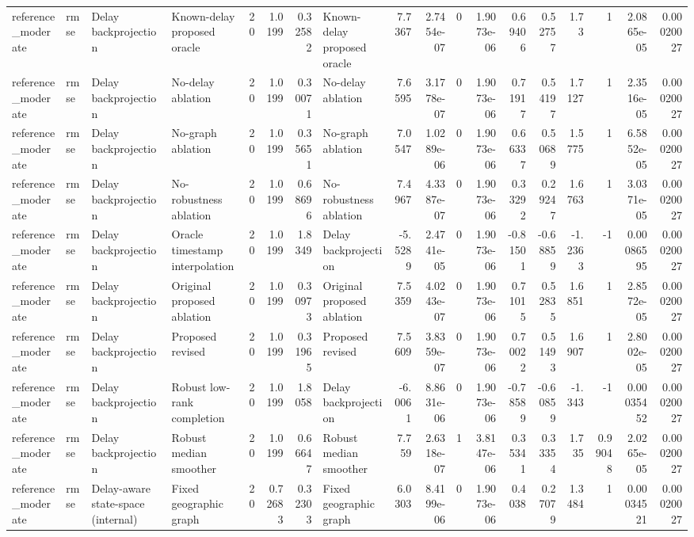\begin{table}[!htbp]
{\begin{tabular}{llllrrrlrrrrrrrrrr}
reference_moderate & rmse & Delay backprojection & Known-delay proposed oracle & 20 & 1.0199 & 0.32582 & Known-delay proposed oracle & 7.7367 & 2.7454e-07 & 0 & 1.9073e-06 & 0.69406 & 0.52757 & 1.73 & 1 & 2.0865e-05 & 0.00020027 \\
reference_moderate & rmse & Delay backprojection & No-delay ablation & 20 & 1.0199 & 0.30071 & No-delay ablation & 7.6595 & 3.1778e-07 & 0 & 1.9073e-06 & 0.71917 & 0.54197 & 1.7127 & 1 & 2.3516e-05 & 0.00020027 \\
reference_moderate & rmse & Delay backprojection & No-graph ablation & 20 & 1.0199 & 0.35651 & No-graph ablation & 7.0547 & 1.0289e-06 & 0 & 1.9073e-06 & 0.66337 & 0.50689 & 1.5775 & 1 & 6.5852e-05 & 0.00020027 \\
reference_moderate & rmse & Delay backprojection & No-robustness ablation & 20 & 1.0199 & 0.68696 & No-robustness ablation & 7.4967 & 4.3387e-07 & 0 & 1.9073e-06 & 0.33292 & 0.29247 & 1.6763 & 1 & 3.0371e-05 & 0.00020027 \\
reference_moderate & rmse & Delay backprojection & Oracle timestamp interpolation & 20 & 1.0199 & 1.8349 & Delay backprojection & -5.5289 & 2.4741e-05 & 0 & 1.9073e-06 & -0.81501 & -0.68859 & -1.2363 & -1 & 0.00086595 & 0.00020027 \\
reference_moderate & rmse & Delay backprojection & Original proposed ablation & 20 & 1.0199 & 0.30973 & Original proposed ablation & 7.5359 & 4.0243e-07 & 0 & 1.9073e-06 & 0.71015 & 0.52835 & 1.6851 & 1 & 2.8572e-05 & 0.00020027 \\
reference_moderate & rmse & Delay backprojection & Proposed revised & 20 & 1.0199 & 0.31965 & Proposed revised & 7.5609 & 3.8359e-07 & 0 & 1.9073e-06 & 0.70022 & 0.51493 & 1.6907 & 1 & 2.8002e-05 & 0.00020027 \\
reference_moderate & rmse & Delay backprojection & Robust low-rank completion & 20 & 1.0199 & 1.8058 & Delay backprojection & -6.0061 & 8.8631e-06 & 0 & 1.9073e-06 & -0.78589 & -0.60859 & -1.343 & -1 & 0.00035452 & 0.00020027 \\
reference_moderate & rmse & Delay backprojection & Robust median smoother & 20 & 1.0199 & 0.66647 & Robust median smoother & 7.759 & 2.6318e-07 & 1 & 3.8147e-06 & 0.35341 & 0.33354 & 1.735 & 0.99048 & 2.0265e-05 & 0.00020027 \\
reference_moderate & rmse & Delay-aware state-space (internal) & Fixed geographic graph & 20 & 0.72683 & 0.32303 & Fixed geographic graph & 6.0303 & 8.4199e-06 & 0 & 1.9073e-06 & 0.4038 & 0.27079 & 1.3484 & 1 & 0.00034521 & 0.00020027 \\

\end{tabular}}
\end{table}
